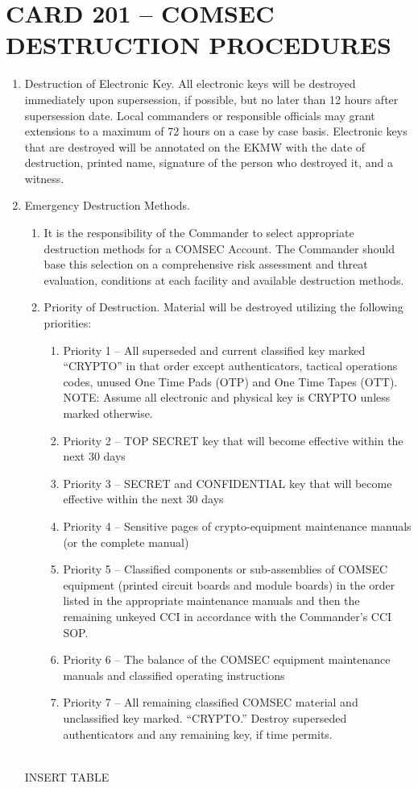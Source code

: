 \documentclass{article}
\begin{document}
\section*{CARD 201 – COMSEC DESTRUCTION PROCEDURES}
\begin{enumerate}
    \item Destruction of Electronic Key. All electronic keys will be destroyed immediately upon supersession, if possible, but no later than 12 hours after supersession date.  Local commanders or responsible officials may grant extensions to a maximum of 72 hours on a case by case basis. Electronic keys that are destroyed will be annotated on the EKMW with the date of destruction, printed name, signature of the person who destroyed it, and a witness. 
\item Emergency Destruction Methods.
\begin{enumerate}
    \item 	It is the responsibility of the Commander to select appropriate destruction methods for a COMSEC Account. The Commander should base this selection on a comprehensive risk assessment and threat evaluation, conditions at each facility and available destruction methods.
\item	Priority of Destruction. Material will be destroyed utilizing the following priorities: 
\begin{enumerate}
    \item	Priority 1 – All superseded and current classified key marked “CRYPTO” in that order except authenticators, tactical operations codes, unused One Time Pads (OTP) and One Time Tapes (OTT). 
NOTE: Assume all electronic and physical key is CRYPTO unless marked otherwise. 
\item Priority 2 – TOP SECRET key that will become effective within the next 30 days
\item	Priority 3 – SECRET and CONFIDENTIAL key that will become effective within the next 30 days
\item	Priority 4 – Sensitive pages of crypto-equipment maintenance manuals (or the complete manual)
\item	Priority 5 – Classified components or sub-assemblies of COMSEC equipment (printed circuit boards and module boards) in the order listed in the appropriate maintenance manuals and then the remaining unkeyed CCI in accordance with the Commander’s CCI SOP.
\item	Priority 6 – The balance of the COMSEC equipment maintenance manuals and classified operating instructions
\item	Priority 7 – All remaining classified COMSEC material and unclassified key marked. “CRYPTO.” Destroy superseded authenticators and any remaining key, if time permits.
\end{enumerate}
\end{enumerate}
\\
INSERT TABLE
\end{enumerate}
\end{document}
